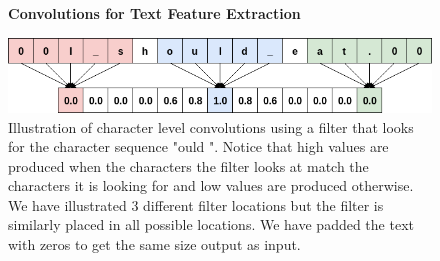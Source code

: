 \begin{figure}
    \centering
    \textbf{Convolutions for Text Feature Extraction}\par\medskip
    \includegraphics[width=\textwidth]{./pictures/experiments/convolution_example.png}
    \caption{Illustration of character level convolutions using a filter that
        looks for the character sequence "ould ". Notice that high values are
        produced when the characters the filter looks at match the characters it
        is looking for and low values are produced otherwise. We have
        illustrated 3 different filter locations but the filter is similarly
        placed in all possible locations. We have padded the text with zeros to
        get the same size output as input.}
    \label{fig:convolution_text_example}
\end{figure}

